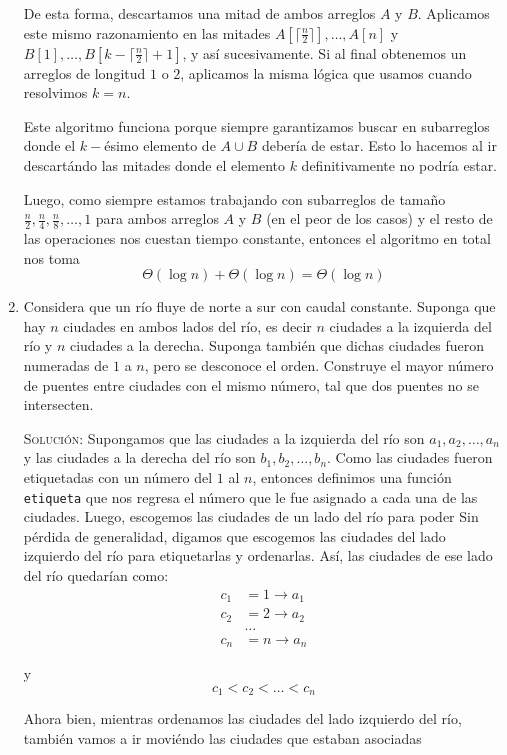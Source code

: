 \documentclass[letterpaper,11pt]{article}
\begin{document}
\begin{enumerate}
    De esta forma, descartamos una mitad de ambos arreglos $A$ y $B$. 
    Aplicamos este mismo razonamiento en las mitades 
    $A[\lceil \frac{n}{2} \rceil], \ldots, A[n]$ y 
    $B[1], \ldots, B[k - \lceil \frac{n}{2} \rceil + 1]$, y así sucesivamente. 
    Si al final obtenemos un arreglos de longitud $1$ o $2$, aplicamos la misma 
    lógica que usamos cuando resolvimos $k=n$.

    Este algoritmo funciona porque siempre garantizamos buscar en subarreglos 
    donde el $k-$ésimo elemento de $A \cup B$ debería de estar. Esto lo 
    hacemos al ir descartándo las mitades donde el elemento $k$ definitivamente 
    no podría estar.

    Luego, como siempre estamos trabajando con subarreglos de tamaño 
    $\frac{n}{2}, \frac{n}{4}, \frac{n}{8}, \ldots, 1$ para ambos arreglos 
    $A$ y $B$ (en el peor de los casos) y el resto de las operaciones nos 
    cuestan tiempo constante, entonces el algoritmo en total nos toma 
    \begin{equation*}
        \Theta(\log n) + \Theta(\log n) = \Theta(\log n)
    \end{equation*}

    \item Considera que un río fluye de norte a sur con caudal constante. 
    Suponga que hay $n$ ciudades en ambos lados del río, es decir $n$ ciudades a 
    la izquierda del río y $n$ ciudades a la derecha. Suponga también que dichas 
    ciudades fueron numeradas de $1$ a $n$, pero se desconoce el orden. Construye 
    el mayor número de puentes entre ciudades con el mismo número, tal que dos 
    puentes no se intersecten. 

    \textsc{Solución:} Supongamos que las ciudades a la izquierda del río son 
    $a_1, a_2, \ldots, a_n$ y las ciudades a la derecha del río son $b_1, b_2, 
    \ldots, b_n$. Como las ciudades fueron etiquetadas con un número del $1$ al 
    $n$, entonces definimos una función \texttt{etiqueta} que nos regresa el 
    número que le fue asignado a cada una de las ciudades. Luego, escogemos las 
    ciudades de un lado del río para poder 
    Sin pérdida de generalidad, digamos que escogemos las ciudades del lado 
    izquierdo del río para etiquetarlas y ordenarlas. Así, las ciudades de ese 
    lado del río quedarían como: 
    \begin{align*}
        c_1 &= 1 \rightarrow a_1 \\
        c_2 &= 2 \rightarrow a_2 \\
        &\ldots \\
        c_n &= n \rightarrow a_n 
    \end{align*}

    y
    \begin{equation*}
    c_1 < c_2 < \ldots < c_n
    \end{equation*}

    Ahora bien, mientras ordenamos las ciudades del lado izquierdo del río, 
    también vamos a ir moviéndo las ciudades que estaban asociadas 

\end{enumerate}
\end{document}
